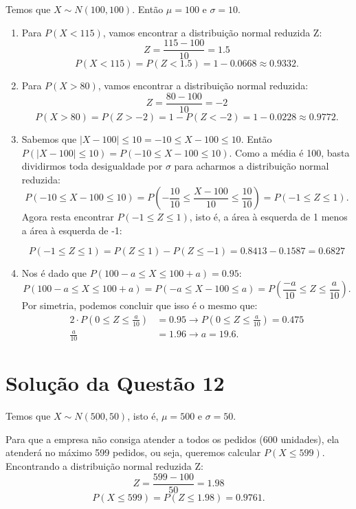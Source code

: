 \documentclass[
	12pt,				%
	openright,			%
	oneside,			%
	a4paper,			%
	english,			%
	brazil,				%
	]{abntex2}
\begin{document}
Temos que $X \sim N(100, 100).$ Então $\mu = 100$ e $\sigma = 10.$
\begin{enumerate}[label=\alph*)]
    \item Para $P(X < 115)$, vamos encontrar a distribuição normal reduzida Z:
    $$Z = \frac{115 - 100}{10} = 1.5$$
    $$P(X < 115) = P(Z < 1.5) =  1 - 0.0668 \approx 0.9332.$$
    
    \item Para $P(X > 80)$, vamos encontrar a distribuição normal reduzida:
    $$Z = \frac{80 - 100}{10} = -2$$
    $$P(X > 80) = P(Z > -2) = 1 - P(Z < -2) = 1 - 0.0228 \approx 0.9772.$$
    
    \item Sabemos que $|X - 100| \leq 10 = -10 \leq X - 100 \leq 10$. Então $P(|X - 100| \leq 10) = P(-10 \leq X - 100 \leq 10)$. Como a média é 100, basta dividirmos toda desigualdade por $\sigma$ para acharmos a distribuição normal reduzida: \label{-1<Z<1}
    $$P(-10 \leq X - 100 \leq 10) = P\left(-\frac{10}{10} \leq \frac{X - 100}{10} \leq \frac{10}{10}\right) = P(-1 \leq Z \leq 1).$$
    Agora resta encontrar $P(-1 \leq Z \leq 1)$, isto é, a área à esquerda de 1 menos a área à esquerda de -1:
    
    $$P(-1 \leq Z \leq 1) = P(Z \leq 1) - P(Z \leq -1) = 0.8413 - 0.1587 = 0.6827$$
    
    \item Nos é dado que $P(100 - a \leq X \leq 100 + a) = 0.95$:
    $$P(100 - a \leq X \leq 100 + a) = P(-a \leq X - 100 \leq a) = P\left(\frac{-a}{10} \leq Z \leq \frac{a}{10}\right).$$
    Por simetria, podemos concluir que isso é o mesmo que:
    \begin{align*}
        2\cdot P\left(0 \leq Z \leq \frac{a}{10}\right) &= 0.95 \to P\left(0 \leq Z \leq \frac{a}{10}\right) = 0.475\\[1em]
        \frac{a}{10} &= 1.96 \to a = 19.6.
    \end{align*}
    \end{enumerate}


\section{Solução da Questão 12}


Temos que $X \sim N(500, 50)$, isto é, $\mu = 500$ e $\sigma = 50$.

Para que a empresa não consiga atender a todos os pedidos (600 unidades), ela atenderá no máximo 599 pedidos, ou seja, queremos calcular $P(X \leq 599)$. Encontrando a distribuição normal reduzida Z:
$$Z = \frac{599 - 100}{50} = 1.98$$
$$P(X \leq 599) = P(Z \leq 1.98) = 0.9761.$$
\end{document}
